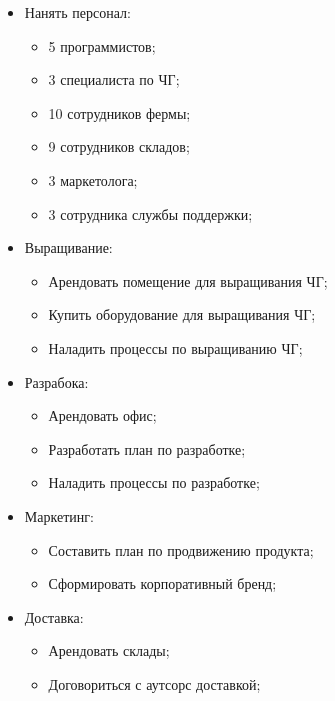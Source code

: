 \documentclass[a4paper,8pt]{article}
\begin{document}
    \begin{itemize}

        \item Нанять персонал:
            \begin{itemize}
                \item 5 программистов;
                \item 3 специалиста по ЧГ;
                \item 10 сотрудников фермы;
                \item 9 сотрудников складов;
                \item 3 маркетолога;
                \item 3 сотрудника службы поддержки;
            \end{itemize}

        \item Выращивание:
            \begin{itemize}
                \item Арендовать помещение для выращивания ЧГ;
                \item Купить оборудование для выращивания ЧГ;
                \item Наладить процессы по выращиванию ЧГ;
            \end{itemize}

        \item Разрабока:
            \begin{itemize}
                \item Арендовать офис;
                \item Разработать план по разработке;
                \item Наладить процессы по разработке;
            \end{itemize}

        \item Маркетинг:
            \begin{itemize}
                \item Составить план по продвижению продукта;
                \item Сформировать корпоративный бренд;
            \end{itemize}

        \item Доставка:
            \begin{itemize}
                \item Арендовать склады;
                \item Договориться с аутсорс доставкой;
            \end{itemize}


\end{itemize}
\end{document}
